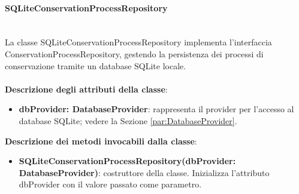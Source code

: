 \documentclass[a4paper,12pt]{article}
\begin{document}
                \paragraph{SQLiteConservationProcessRepository}\label{par:SQLiteConservationProcessRepository}\mbox{}\\
                La classe SQLiteConservationProcessRepository implementa l'interfaccia ConservationProcessRepository, gestendo la persistenza dei processi di conservazione tramite un database SQLite locale.\\
                \\
                \textbf{Descrizione degli attributi della classe}:
                \begin{itemize}
                    \item \textbf{dbProvider: DatabaseProvider}: rappresenta il provider per l'accesso al database SQLite; vedere la Sezione \ref{par:DatabaseProvider}.
                \end{itemize}
 
              \noindent \textbf{Descrizione dei metodi invocabili dalla classe}:
                \begin{itemize}
                    \item \textbf{SQLiteConservationProcessRepository(dbProvider: DatabaseProvider)}: costruttore della classe. Inizializza l'attributo dbProvider con il valore passato come parametro.
                \end{itemize}
\end{document}

